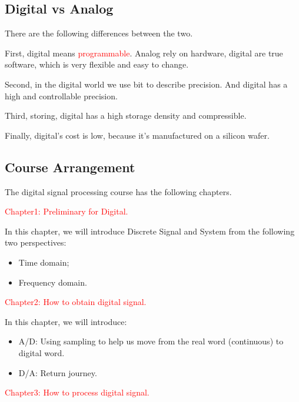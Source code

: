     \subsection{Digital vs Analog}
        There are the following differences between the two.

        First, digital means \textcolor{red}{programmable}. 
        Analog rely on hardware, digital are true software, which is very flexible and easy to change.

        Second, in the digital world we use bit to describe precision. 
        And digital has a high and controllable precision.
        
        Third, storing, digital has a high storage density and compressible.

        Finally, digital's cost is low, because it's manufactured on a silicon wafer.

    \subsection{Course Arrangement}
        The digital signal processing course has the following chapters.

        \noindent \textcolor{red}{Chapter1: Preliminary for Digital.} 

        In this chapter, we will introduce {Discrete Signal and System} from the following two perspectives:
            \begin{itemize}
                \item Time domain;
                \item Frequency domain.
            \end{itemize}
        
        \noindent \textcolor{red}{Chapter2: How to obtain digital signal.} 
        
        In this chapter, we will introduce:
            \begin{itemize}
                \item A/D: Using sampling to help us move from the real word (continuous) to digital word.
                \item D/A: Return journey.
            \end{itemize}
        
        
        \noindent \textcolor{red}{Chapter3: How to process digital signal.} 

